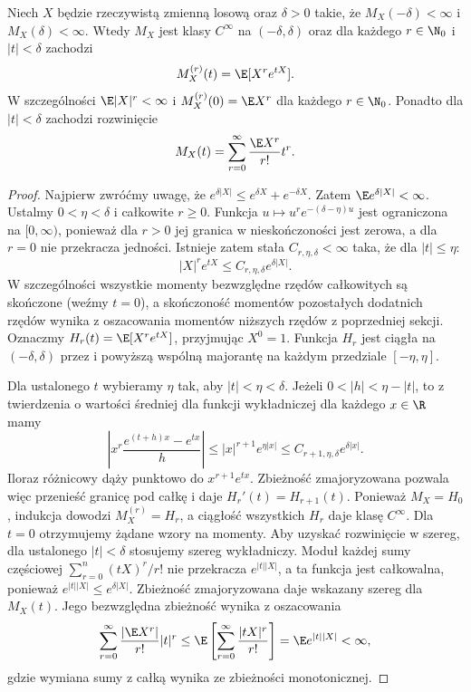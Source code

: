 \begin{twierdzenie}
Niech $X$ będzie rzeczywistą zmienną losową oraz
$\delta>0$ takie, że $M_X(-\delta)<\infty$ i
$M_X(\delta)<\infty$. Wtedy $M_X$ jest klasy $C^\infty$ na $(-\delta,\delta)$ oraz
dla każdego $r\in\N_0$ i $|t|<\delta$ zachodzi
\[
M_X^{(r)}(t)=\E[X^r e^{tX}].
\]
W szczególności $\E|X|^r<\infty$ i
$M_X^{(r)}(0)=\E X^r$ dla każdego $r\in\N_0$.
Ponadto dla $|t|<\delta$ zachodzi rozwinięcie
\[
M_X(t)=\sum_{r=0}^\infty\frac{\E X^r}{r!}t^r.
\]
\end{twierdzenie}
\begin{proof}
Najpierw zwróćmy uwagę, że
$e^{\delta|X|}\leq e^{\delta X}+e^{-\delta X}$.
Zatem $\E e^{\delta|X|}<\infty$.
Ustalmy $0<\eta<\delta$ i całkowite $r\geq0$.
Funkcja $u\mapsto u^re^{-(\delta-\eta)u}$ jest ograniczona na
$[0,\infty)$, ponieważ dla $r>0$ jej granica w nieskończoności
jest zerowa, a dla $r=0$ nie przekracza jedności.
Istnieje zatem stała $C_{r,\eta,\delta}<\infty$ taka, że
dla $|t|\leq\eta$:
\[
|X|^re^{tX}\leq C_{r,\eta,\delta}e^{\delta|X|}.
\]
W szczególności wszystkie momenty bezwzględne rzędów
całkowitych są skończone (weźmy $t=0$), a skończoność
momentów pozostałych dodatnich rzędów wynika z oszacowania
momentów niższych rzędów z poprzedniej sekcji. Oznaczmy $H_r(t)=\E[X^re^{tX}]$,
przyjmując $X^0=1$. Funkcja $H_r$ jest ciągła na
$(-\delta,\delta)$ przez
i powyższą wspólną majorantę na każdym przedziale
$[-\eta,\eta]$.

Dla ustalonego $t$ wybieramy $\eta$ tak, aby
$|t|<\eta<\delta$. Jeżeli $0<|h|<\eta-|t|$, to
z twierdzenia o wartości średniej dla funkcji wykładniczej
dla każdego $x\in\R$ mamy
\[
\left|x^r\frac{e^{(t+h)x}-e^{tx}}{h}\right|
\leq |x|^{r+1}e^{\eta|x|}
\leq C_{r+1,\eta,\delta}e^{\delta|x|}.
\]
Iloraz różnicowy dąży punktowo do $x^{r+1}e^{tx}$.
Zbieżność zmajoryzowana pozwala więc przenieść granicę
pod całkę i daje $H_r'(t)=H_{r+1}(t)$.
Ponieważ $M_X=H_0$, indukcja dowodzi
$M_X^{(r)}=H_r$, a ciągłość wszystkich $H_r$ daje klasę
$C^\infty$. Dla $t=0$ otrzymujemy żądane wzory na momenty.
Aby uzyskać rozwinięcie w szereg, dla ustalonego $|t|<\delta$
stosujemy szereg wykładniczy. Moduł każdej sumy częściowej
$\sum_{r=0}^n(tX)^r/r!$ nie przekracza $e^{|t||X|}$,
a ta funkcja jest całkowalna, ponieważ
$e^{|t||X|}\leq e^{\delta|X|}$. Zbieżność zmajoryzowana
daje wskazany szereg dla $M_X(t)$. Jego bezwzględna zbieżność
wynika z oszacowania
\[
\sum_{r=0}^\infty\frac{|\E X^r|}{r!}|t|^r
\leq \E\left[\sum_{r=0}^\infty\frac{|tX|^r}{r!}\right]
=\E e^{|t||X|}<\infty,
\]
gdzie wymiana sumy z całką wynika ze zbieżności monotonicznej.
\end{proof}


